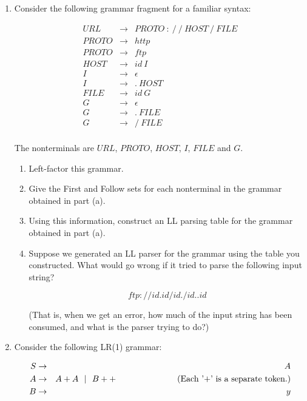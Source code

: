 \documentclass[12pt]{article}
\begin{document}
\begin{enumerate}
\iffalse 
\medskip

\item Consider the following grammar fragment for a familiar syntax:

\begin{eqnarray*}
URL & \rightarrow & PROTO \ : \ / \ / \ HOST \ / \ FILE  \\
PROTO & \rightarrow & http \\
PROTO & \rightarrow & ftp \\
HOST & \rightarrow & id \ I \\
I & \rightarrow & \epsilon \\
I & \rightarrow & . \ HOST \\
FILE & \rightarrow & id \ G \\ 
G & \rightarrow & \epsilon \\ 
G & \rightarrow & . \ FILE \\
G & \rightarrow & / \ FILE \\
\end{eqnarray*}

The nonterminals are $URL$, $PROTO$, $HOST$, $I$, $FILE$ and $G$. 

\begin{enumerate}

\item Left-factor this grammar.

\item Give the First and Follow sets for each nonterminal in the grammar
obtained in part (a).

\item \label{lltable} Using this information, construct an LL parsing
table for the grammar obtained in part (a).

\item Suppose we generated an LL parser for the grammar using the table
you constructed. What would go wrong if it tried to parse the following
input string?

\[
ftp : / / id . id / id . / id . . id
\]

(That is, when we get an error, how much of the input string has been
consumed, and what is the parser trying to do?)

\end{enumerate}


\medskip

\item 

Consider the following LR(1) grammar:

\begin{eqnarray*}
  S & \rightarrow & A \\
  A & \rightarrow & A + A \ \ |\ \  B + + \hbox{\hskip 1in (Each '+' is a separate token.)}\\
  B & \rightarrow & y
\end{eqnarray*}


\end{enumerate}
\end{document}
